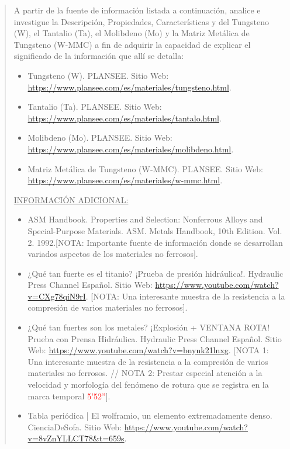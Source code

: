 \documentclass[12pt,a4paper]{article}
\begin{document}

\newpage
\tableofcontents

\begin{abstract}
    A partir de la fuente de información listada a continuación, analice e investigue la Descripción, Propiedades, Características y del Tungsteno (W), el Tantalio (Ta), el Molibdeno (Mo) y la Matriz Metálica de Tungsteno (W-MMC) a fin de adquirir la capacidad de explicar el significado de la información que allí se detalla:
    \begin{itemize}
        \item Tungsteno (W). PLANSEE. Sitio Web: \url{https://www.plansee.com/es/materiales/tungsteno.html}.
        \item Tantalio (Ta). PLANSEE. Sitio Web: \url{https://www.plansee.com/es/materiales/tantalo.html}.
        \item Molibdeno (Mo). PLANSEE. Sitio Web: \url{https://www.plansee.com/es/materiales/molibdeno.html}.
        \item Matriz Metálica de Tungsteno (W-MMC). PLANSEE. Sitio Web: \url{https://www.plansee.com/es/materiales/w-mmc.html}.
    \end{itemize}
    \underline{INFORMACIÓN ADICIONAL:}
    \begin{itemize}
        \item ASM Handbook. Properties and Selection: Nonferrous Alloys and Special-Purpose Materials. ASM. Metals Handbook, 10th Edition. Vol. 2. 1992.[NOTA: Importante fuente de información donde se desarrollan variados aspectos de los materiales no ferrosos].
        \item ¿Qué tan fuerte es el titanio? ¡Prueba de presión hidráulica!. Hydraulic Press Channel Español. Sitio Web: \url{https://www.youtube.com/watch?v=CXg78qiN9rI}. [NOTA: Una interesante muestra de la resistencia a la compresión de varios materiales no ferrosos].
        \item ¿Qué tan fuertes son los metales? ¡Explosión + VENTANA ROTA! Prueba con Prensa Hidráulica. Hydraulic Press Channel Español. Sitio Web: \url{https://www.youtube.com/watch?v=bnynk21lnxg}. [NOTA 1: Una interesante muestra de la resistencia a la compresión de varios materiales no ferrosos. // NOTA 2: Prestar especial atención a la velocidad y morfología del fenómeno de rotura que se registra en la marca temporal \textcolor{red}{5’52”}].
        \item Tabla periódica | El wolframio, un elemento extremadamente denso. CienciaDeSofa. Sitio Web: \url{https://www.youtube.com/watch?v=8vZnYLLCT78&t=659s}.

\end{itemize}
\end{abstract}
\end{document}
